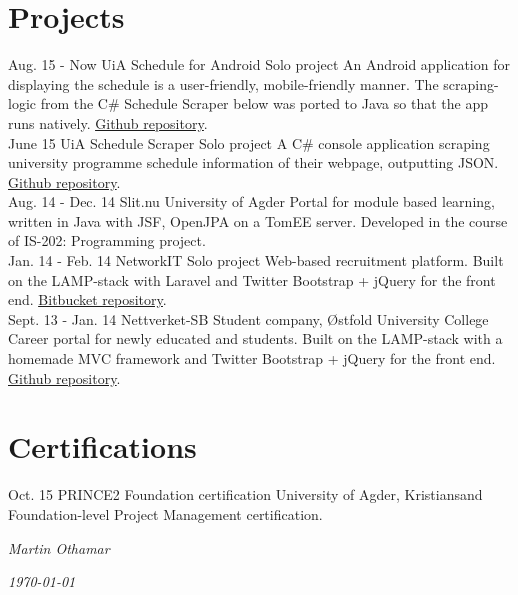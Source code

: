 \documentclass[]{cv-class}
\begin{document}
\section{Projects}
\begin{entrylist}
  \entry
    {Aug. 15 - Now}
    {UiA Schedule for Android}
    {Solo project}
    {An Android application for displaying the schedule is a user-friendly,
    mobile-friendly manner. The scraping-logic from the C\# Schedule Scraper below
    was ported to Java so that the app runs natively.
    \underline{\href{https://github.com/martinothamar/UiA-Timeplan-Android}
    {Github repository}}.\\}
  \entry
    {June 15}
    {UiA Schedule Scraper}
    {Solo project}
    {A C\# console application scraping university programme schedule information
    of their webpage, outputting JSON.
    \underline{\href{https://github.com/martinothamar/UiA-ScheduleGrabber}
    {Github repository}}.\\}
  \entry
    {Aug. 14 - Dec. 14}
    {Slit.nu}
    {University of Agder}
    {Portal for module based learning, written in Java with JSF, OpenJPA on a TomEE server.
    Developed in the course of IS-202: Programming project.\\}
  \entry
    {Jan. 14 - Feb. 14}
    {NetworkIT}
    {Solo project}
    {Web-based recruitment platform.
    Built on the LAMP-stack with Laravel and Twitter Bootstrap + jQuery for the front end.
    \underline{\href{https://bitbucket.org/martinothamar/networkit}{Bitbucket repository}}.\\}
  \entry
    {Sept. 13 - Jan. 14}
    {Nettverket-SB}
    {Student company, {{\O}}stfold University College}
    {Career portal for newly educated and students.
    Built on the LAMP-stack with a homemade MVC framework and 
    Twitter Bootstrap + jQuery for the front end.
    \underline{\href{https://github.com/martinothamar/Nettverket-SB}{Github repository}}.}
\end{entrylist}


\section{Certifications}
\begin{entrylist}
  \entry
    {Oct. 15}
    {PRINCE2 Foundation certification}
    {University of Agder, Kristiansand}
    {Foundation-level Project Management certification.}
\end{entrylist}

\vspace{1.5cm}
\begin{flushright}
\emph{Martin Othamar}
\end{flushright}
\begin{flushright}
\emph{\today}
\end{flushright}
\end{document}
